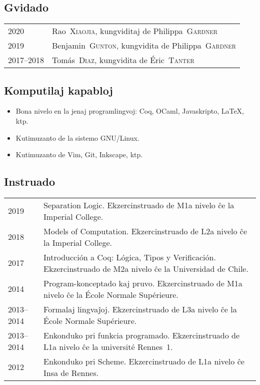 \documentclass[12pt,a4paper]{article}
\makeatletter
\newcommand{\en}[1]{\foreignlanguage{english}{{#1}}}
\newcommand{\fr}[1]{\foreignlanguage{french}{{#1}}}
\newcommand{\es}[1]{\foreignlanguage{spanish}{{#1}}}
\newcommand{\en}[1]{\foreignlanguage{english}{{#1}}}
\newcommand{\fr}[1]{\foreignlanguage{french}{{#1}}}
\newcommand{\es}[1]{\foreignlanguage{spanish}{{#1}}}
\newenvironment{datecvsection}[1]%
               {\subsection*{#1}%
                 \noindent \begin{tabular}{@{}p{\annee}p{\texte}@{}}}
               {\end{tabular}}
\newenvironment{itemcvsection}[1]%
               {\subsection*{#1}\begin{itemize}}
               {\end{itemize}}
\newcommand\familyName{\textsc}
\newcommand\placeName{}
\makeatother
\begin{document}
\begin{datecvsection}{Gvidado}

		2020 & Rao~\familyName{Xiaojia}, kungviditaj de Philippa~\familyName{Gardner} \\
		2019 & Benjamin~\familyName{Gunton}, kungvidita de Philippa~\familyName{Gardner} \\
		2017–2018 & Tomás~\familyName{Diaz}, kungvidita de Éric~\familyName{Tanter} \\

\end{datecvsection}

\begin{itemcvsection}{Komputilaj kapabloj}

  \item Bona nivelo en la jenaj programlingvoj:  Coq, OCaml, Javaskripto, \LaTeX, ktp.
  \item Kutimuzanto de la sistemo GNU/Linux.
  \item Kutimuzanto de Vim, Git, Inkscape, ktp.

\end{itemcvsection}

\begin{datecvsection}{Instruado}

    2019 & Separation Logic. Ekzercinstruado de M1a nivelo ĉe la \en{\placeName{Imperial College}}. \\

    2018 & Models of Computation. Ekzercinstruado de L2a nivelo ĉe la \en{\placeName{Imperial College}}. \\

    2017 & Introducción a Coq: Lógica, Tipos y Verificación. Ekzercinstruado de M2a nivelo ĉe la \es{\placeName{Universidad de Chile}}. \\

    2014 & Program-konceptado kaj pruvo. Ekzercinstruado de M1a nivelo ĉe la \fr{\placeName{École Normale Supérieure}}. \\

    2013–2014 & Formalaj lingvaĵoj. Ekzercinstruado de L3a nivelo ĉe la \fr{\placeName{École Normale Supérieure}}. \\

    2013–2014 & Enkonduko pri funkcia programado. Ekzercinstruado de L1a nivelo ĉe la \fr{université \placeName{Rennes}~1}. \\

    2012 & Enkonduko pri Scheme. Ekzercinstruado de L1a nivelo ĉe \placeName{Insa} de \placeName{Rennes}. \\

\end{datecvsection}
\end{document}
